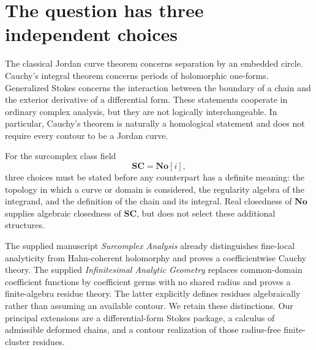 \documentclass[11pt,letterpaper]{article}
\theoremstyle{definition}
\theoremstyle{remark}
\newcommand{\No}{\mathbf{No}}
\newcommand{\SC}{\mathbf{SC}}
\numberwithin{equation}{section}
\begin{document}
\section{The question has three independent choices}\label{sec:intro}
The classical Jordan curve theorem concerns separation by an embedded circle. Cauchy's integral theorem concerns periods of holomorphic one-forms. Generalized Stokes concerns the interaction between the boundary of a chain and the exterior derivative of a differential form. These statements cooperate in ordinary complex analysis, but they are not logically interchangeable. In particular, Cauchy's theorem is naturally a homological statement and does not require every contour to be a Jordan curve.

For the surcomplex class field
\[
\SC=\No[i],
\]
three choices must be stated before any counterpart has a definite meaning: the topology in which a curve or domain is considered, the regularity algebra of the integrand, and the definition of the chain and its integral. Real closedness of $\No$ supplies algebraic closedness of $\SC$, but does not select these additional structures.

The supplied manuscript \emph{Surcomplex Analysis} \cite{SA} already distinguishes fine-local analyticity from Hahn-coherent holomorphy and proves a coefficientwise Cauchy theory. The supplied \emph{Infinitesimal Analytic Geometry} \cite{AG} replaces common-domain coefficient functions by coefficient germs with no shared radius and proves a finite-algebra residue theory. The latter explicitly defines residues algebraically rather than assuming an available contour. We retain these distinctions. Our principal extensions are a differential-form Stokes package, a calculus of admissible deformed chains, and a contour realization of those radius-free finite-cluster residues.
\end{document}
